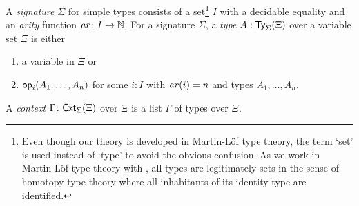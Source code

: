 \begin{definition} \label{def:simple-signature}
  A \emph{signature} $\Sigma$ for simple types consists of a set\footnote{%
    Even though our theory is developed in Martin-L\"of type theory, the term `set' is used instead of `type' to avoid the obvious confusion. 
    As we work in Martin-L\"of type theory with \AxiomK, all types are legitimately sets in the sense of homotopy type theory where all inhabitants of its identity type are identified.}
  $I$ with a decidable equality and an \emph{arity} function $\mathit{ar}\colon I \to \mathbb{N}$.
  For a signature $\Sigma$, a \emph{type} $A : \mathsf{Ty}_{\Sigma}(\Xi)$ over a variable set $\Xi$ is either
  \begin{enumerate}
    \item a variable in $\Xi$ or
    \item $\mathsf{op}_{i}(A_1, \ldots, A_n)$ for some $i:I$ with $\mathit{ar}(i) = n$ and types $A_1,\ldots, A_n$.
  \end{enumerate}
  A \emph{context} $\Gamma \colon \mathsf{Cxt}_{\Sigma}(\Xi)$ over $\Xi$ is a list $\Gamma$ of types over $\Xi$. 
\end{definition}

